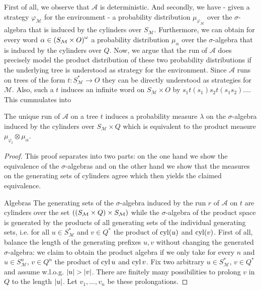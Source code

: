 First of all, we observe that $\mathcal{A}$ is deterministic. And secondly, we
have - given a strategy $\varphi_{\mathcal{M}}$ for the environment - a
probability distribution $\mu_{\varphi_{\mathcal{M}}}$ over the
$\sigma$-algebra that is induced by the cylinders over $S_{\mathcal{M}}$.
Furthermore, we can obtain for every word
$\alpha\in\left(S_{\mathcal{M}}\times O\right)^{\omega}$ a probability distribution
$\mu_{\alpha}$ over the $\sigma$-algebra that is induced by the cylinders over
$Q$. Now, we argue that the run of $\mathcal{A}$ does precisely model the
product distribution of these two probability distributions if the underlying
tree is understood as strategy for the environment. Since $\mathcal{A}$ runs on
trees of the form $t:S_{\mathcal{M}}^{*}\rightarrow O$ they can be directly
understood as strategies for $\mathcal{M}$. Also, such a $t$ induces an
infinite word on $S_{\mathcal{M}}\times O$ by
$s_{1}t(s_{1})s_{2}t(s_{1}s_{2})\dots$. This cummulates into
\begin{lemma}
  The unique run of $\mathcal{A}$ on a tree $t$ induces a probability measure
  $\lambda$ on the $\sigma$-algebra induced by the cylinders over
  $S_{\mathcal{M}}\times Q$ which is equivalent to the product measure
  $\mu_{\varphi_{t}}\otimes \mu_{\alpha}$.
\end{lemma}
\begin{proof}
  This proof separates into two parts: on the one hand we show the equivalence
  of the $\sigma$-algebras and on the other hand we show that the measures on
  the generating sets of cylinders agree which then yields the claimed
  equivalence.
\item [Algebras]
  The generating sets of the $\sigma$-algebra induced by the run $r$ of
  $\mathcal{A}$ on $t$ are cylinders over the set
  $\left(\left(S_{\mathcal{M}}\times Q\right)\times S_{\mathcal{M}}\right)$ while the
  $\sigma$-algebra of the product space is generated by the products of all
  generating sets of the individual generating sets, i.e. for all
  $u\in S_{\mathcal{M}}^{*}$ and $v\in Q^{*}$ the product of $\operatorname{cyl}(u)$ and
  $\operatorname{cyl}(v)$. First of all, balance the length of the generating prefixes $u, v$
  without changing the generated $\sigma$-algebra: we claim to obtain the
  product algebra if we only take for every $n$ and $u\in S_{\mathcal{M}}^{n}$,
  $v\in Q^{n}$ the product of $\operatorname{cyl}{u}$ and $\operatorname{cyl}{v}$. Fix two arbitrary
  $u\in S_{\mathcal{M}}^{*}$, $v\in Q^{*}$ and assume w.l.o.g.
  $\left\vert{u}\right\vert > \left\vert{v}\right\vert$. There are finitely many possibilities to prolong
  $v$ in $Q$ to the length $\left\vert{u}\right\vert$. Let $v_{1},\dots, v_{n}$ be these
  prolongations.
\end{proof}
